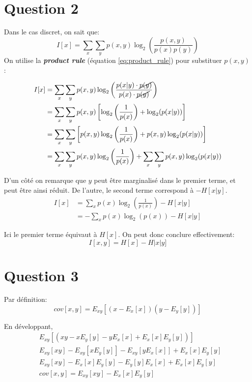 \section{Question 2}
Dans le cas discret, on sait que:
\begin{equation*}
    I[x] = \sum_x \sum_y p(x, y) \log_2\left(\frac{p(x, y)}{p(x)p(y)}\right)
\end{equation*}
On utilise la \textbf{\textit{product rule}} (équation \ref{eq:product_rule}) pour substituer \(p(x,y)\):

\begin{equation*}
    \begin{split}
        I[x] &= \sum_x \sum_y p(x, y) \log_2 \left( \frac{p(x|y) \cdot \cancel{p(y)}}{p(x) \cdot \cancel{p(y)}} \right) \\
        &=\sum_x \sum_y p(x, y) \left[ \log_2 \left( \frac{1}{p(x)} \right) + \log_2(p(x|y)) \right] \\
        &=\sum_x \sum_y \left[p(x, y) \log_2 \left( \frac{1}{p(x)} \right) + p(x, y) \log_2(p(x|y)) \right] \\
        &=\sum_x \sum_y p(x, y) \log_2 \left( \frac{1}{p(x)}\right) + \sum_x \sum_y p(x, y) \log_2(p(x|y))
    \end{split}
\end{equation*}

D'un côté on remarque que $y$ peut être marginalisé dans le premier terme, et peut être ainsi réduit. De l'autre, le second terme correspond à $-H[x|y]$.
\begin{equation*}
    \begin{split}
        I[x] & = \sum_x p(x) \log_2(\frac{1}{p(x)}) - H[x|y] \\
        & = -\sum_x p(x) \log_2(p(x)) - H[x|y]
    \end{split}
\end{equation*}

Ici le premier terme équivaut à $H[x]$. \newline
On peut donc conclure effectivement: $$I[x, y] = H[x]-H|x|y]$$

\section{Question 3}
Par définition:
$$ cov[x, y] = E_{x y}[(x-E_x[x])(y-E_y[y])]$$

En développant,
\begin{equation*}
    \begin{split}
        &E_{x y}[(x y - x E_y[y] - y E_x[x] + E_x[x] E_y[y])] \\
        &E_{x y}[x y] - E_{xy}[x E_y[y]] - E_{xy}[y E_x[x]] + E_x[x] E_y[y] \\
        &E_{x y}[x y] - E_x[x] E_y[y] - E_y[y] E_x[x] + E_x[x] E_y[y] \\
        &cov[x, y] = E_{x y}[x y] - E_x[x] E_y[y]
    \end{split}
\end{equation*}

